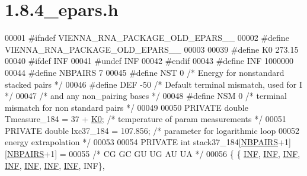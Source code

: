 \hypertarget{1_88_84__epars_8h_source}{}\section{1.8.4\+\_\+epars.h}
\label{1_88_84__epars_8h_source}

\begin{DoxyCode}
00001 \textcolor{preprocessor}{#ifndef VIENNA\_RNA\_PACKAGE\_OLD\_EPARS\_\_}
00002 \textcolor{preprocessor}{#define VIENNA\_RNA\_PACKAGE\_OLD\_EPARS\_\_}
00003 
00039 \textcolor{preprocessor}{#define K0        273.15}
00040 \textcolor{preprocessor}{#ifdef INF}
00041 \textcolor{preprocessor}{#undef INF}
00042 \textcolor{preprocessor}{#endif}
00043 \textcolor{preprocessor}{#define INF       1000000}
00044 \textcolor{preprocessor}{#define NBPAIRS   7}
00045 \textcolor{preprocessor}{#define NST       0     }\textcolor{comment}{/* Energy for nonstandard stacked pairs */}\textcolor{preprocessor}{}
00046 \textcolor{preprocessor}{#define DEF       -50   }\textcolor{comment}{/* Default terminal mismatch, used for I */}\textcolor{preprocessor}{}
00047                         \textcolor{comment}{/* and any non\_pairing bases */}
00048 \textcolor{preprocessor}{#define NSM       0     }\textcolor{comment}{/* terminal mismatch for non standard pairs */}\textcolor{preprocessor}{}
00049 
00050 PRIVATE \textcolor{keywordtype}{double} Tmeasure\_184 = 37 + \hyperlink{constants_8h_a307c72605e3713972b4f4fb2d53ea20e}{K0};  \textcolor{comment}{/* temperature of param measurements */}
00051 PRIVATE \textcolor{keywordtype}{double} lxc37\_184    = 107.856;  \textcolor{comment}{/* parameter for logarithmic loop}
00052 \textcolor{comment}{                                           energy extrapolation */}
00053 
00054 PRIVATE \textcolor{keywordtype}{int} stack37\_184[\hyperlink{constants_8h_a5e75221c779d618eab81e096f37e32ce}{NBPAIRS}+1][\hyperlink{constants_8h_a5e75221c779d618eab81e096f37e32ce}{NBPAIRS}+1] =
00055 \textcolor{comment}{/*          CG     GC     GU     UG     AU     UA  */}
00056 \{ \{  \hyperlink{constants_8h_a12c2040f25d8e3a7b9e1c2024c618cb6}{INF},   \hyperlink{constants_8h_a12c2040f25d8e3a7b9e1c2024c618cb6}{INF},   \hyperlink{constants_8h_a12c2040f25d8e3a7b9e1c2024c618cb6}{INF},   \hyperlink{constants_8h_a12c2040f25d8e3a7b9e1c2024c618cb6}{INF},   \hyperlink{constants_8h_a12c2040f25d8e3a7b9e1c2024c618cb6}{INF},   \hyperlink{constants_8h_a12c2040f25d8e3a7b9e1c2024c618cb6}{INF},   \hyperlink{constants_8h_a12c2040f25d8e3a7b9e1c2024c618cb6}{INF}, INF\},

\end{DoxyCode}
